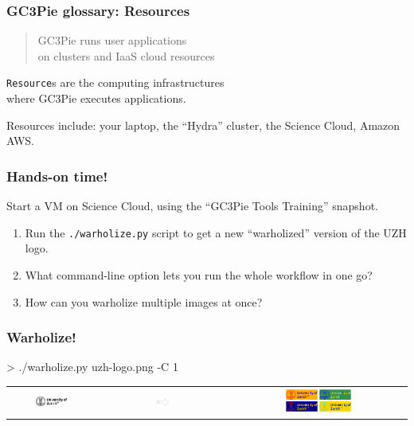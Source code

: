 \documentclass[english,serif,mathserif,usenames,dvipsnames]{beamer}
\begin{document}
\begin{frame}
  \frametitle{GC3Pie glossary: Resources}
  \begin{quote}
    GC3Pie runs user applications
    \\
    on clusters and IaaS cloud \alert{resources}
  \end{quote}

  \+ \alert{\texttt{Resource}s are the computing infrastructures \\ where GC3Pie executes applications.}

  \+ Resources include: your laptop, the ``Hydra'' cluster, the Science Cloud, Amazon AWS.
\end{frame}


\begin{frame}
  \frametitle{Hands-on time!}

  Start a VM on Science Cloud, using the ``GC3Pie Tools Training'' snapshot.

  \+
  \begin{exercise}

    \begin{enumerate}
    \item Run the \texttt{./warholize.py} script to get a new
      ``warholized'' version of the UZH logo.

    \item What command-line option lets you run the whole workflow
      in one go?

    \item How can you warholize \textrm{multiple} images at once?
    \end{enumerate}
  \end{exercise}
\end{frame}


\begin{frame}
  \frametitle{Warholize!}

\begin{semiverbatim}
    > ./warholize.py uzh-logo.png -C 1
\end{semiverbatim}

  \begin{tabular}[c]{ccc}
    \includegraphics[width=0.4\textwidth]{fig/uzh-logo.png}
    &
    \includegraphics[width=0.1\textwidth]{fig/arrow.pdf}
    &
    \includegraphics[width=0.4\textwidth]{fig/warholized-uzh-logo.png}
  \end{tabular}
\end{frame}
\end{document}
